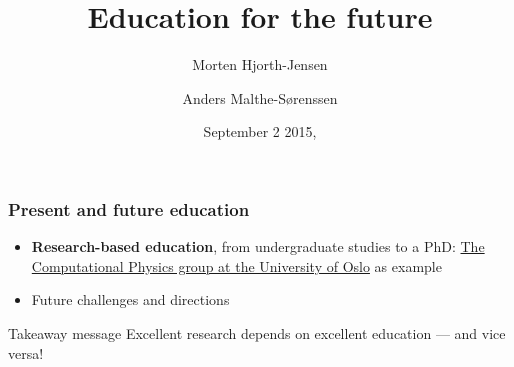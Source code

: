\documentclass{beamer}
\begin{document}







\title{Education for the future}


\author{Morten Hjorth-Jensen
\and
Anders Malthe-Sørenssen}

\date{September 2 2015,
}

\begin{frame}
\titlepage
\end{frame}

\begin{frame}
\frametitle{Present and future education}

\begin{block}{}

\begin{itemize}
\item \textbf{Research-based education}, from undergraduate studies to a PhD: \href{{http://www.mn.uio.no/fysikk/english/research/groups/computational/index.html}}{The Computational Physics group at the University of Oslo} as example

\item Future challenges and directions
\end{itemize}

\noindent
\end{block}
\begin{block}{Takeaway message }
Excellent research depends on excellent education --- and vice versa!
\end{block}
\end{frame}
\end{document}
